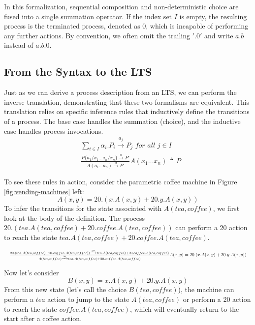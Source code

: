In this formalization, sequential composition and non-deterministic choice are fused into a single summation operator. If the index set $I$ is empty, the resulting process is the terminated process, denoted as 0, which is incapable of performing any further actions. By convention, we often omit the trailing $'.0'$ and write $a.b$ instead of $a.b.0$.

\subsection{From the Syntax to the LTS}
Just as we can derive a process description from an LTS, we can perform the inverse translation, demonstrating that these two formalisms are equivalent. This translation relies on specific inference rules that inductively define the transitions of a process. The base case handles the summation (choice), and the inductive case handles process invocations.
\begin{align*}
    &\sum_{i\in I}\alpha_i.P_i\xrightarrow{a_j}P_j\textit{ for all }j\in I\\
    &\frac{P\{a_1/x_1\ldots a_n/x_n\}\xrightarrow{\alpha}P'}{A(a_1\ldots a_n)\xrightarrow{\alpha}P'}A(x_1\ldots x_n)\triangleq P
\end{align*}

To see these rules in action, consider the parametric coffee machine in Figure \ref{fig:vending-machines} left: 
\begin{equation*}
    A(x,y)=20.(x.A(x,y)+20.y.A(x,y))
\end{equation*}
To infer the transitions for the state associated with $A(tea,coffee)$, we first look at the body of the definition. The process $20.(tea.A(tea,coffee)+20.coffee.A(tea,coffee))$ can perform a 20 action to reach the state $tea.A(tea,coffee)+20.coffee.A(tea,coffee)$. 

\[
\resizebox{\linewidth}{!}{$
    \frac{20.(tea.A(tea,coffee)+20.coffee.A(tea,coffee))\xrightarrow{20}tea.A(tea,coffee)+20.coffee.A(tea,coffee)}{A(tea,coffee)\xrightarrow{20}tea.A(tea,coffee)+20.coffee.A(tea,coffee)}
    A(x,y)=20.(x.A(x,y)+20.y.A(x,y))
$}
\]

Now let's consider
\begin{equation*}
    B(x,y) = x.A(x,y) + 20.y.A(x,y)
\end{equation*}
From this new state (let's call the choice $B(tea,coffee)$), the machine can perform a $tea$ action to jump to the state $A(tea,coffee)$ or perform a 20 action to reach the state $coffee.A(tea,coffee)$, which will eventually return to the start after a coffee action.

